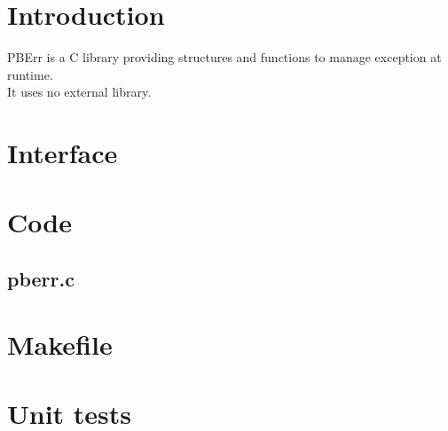 \section*{Introduction}

PBErr is a C library providing structures and functions to manage exception at runtime.\\ 

It uses no external library.\\

\section{Interface}

\begin{scriptsize}
\begin{ttfamily}

\end{ttfamily}
\end{scriptsize}

\section{Code}

\subsection{pberr.c}

\begin{scriptsize}
\begin{ttfamily}

\end{ttfamily}
\end{scriptsize}

\section{Makefile}

\begin{scriptsize}
\begin{ttfamily}

\end{ttfamily}
\end{scriptsize}

\section{Unit tests}

\begin{scriptsize}
\begin{ttfamily}

\end{ttfamily}
\end{scriptsize}

